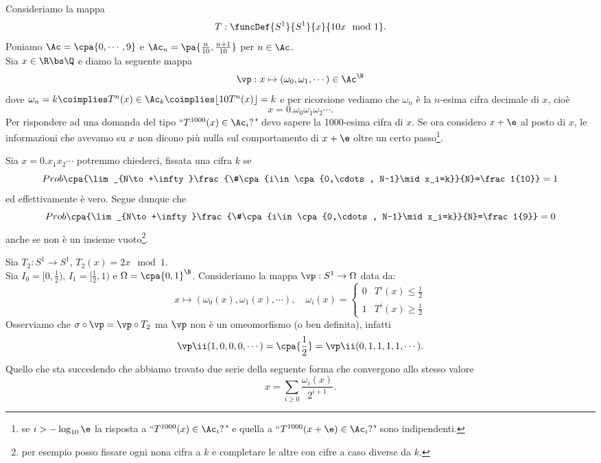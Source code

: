 \begin{example}
Consideriamo la mappa
\[T:\funcDef{S^1}{S^1}{x}{10x \mod 1}.\]
Poniamo $\Ac=\cpa{0,\cdots,9}$ e $\Ac_n=\pa{\frac n{10},\frac{n+1}{10}}$ per $n\in\Ac$.\\
Sia $x\in \R\bs \Q$ e diamo la seguente mappa
\[\vp:x\mapsto(\omega_0,\omega_1,\cdots)\in \Ac^{\N}\]
dove $\omega_n=k\coimplies T^n(x)\in \Ac_k\coimplies \lfloor10 T^n(x)\rfloor=k$ e per ricorsione vediamo che $\omega_n$ \`e la $n$-esima cifra decimale di $x$, cio\`e
\[x=0.\omega_0\omega_1\omega_2\cdots.\]
Per rispondere ad una domanda del tipo ``$T^{1000}(x)\in \Ac_i?$" devo sapere la 1000-esima cifra di $x$. Se ora considero $x+\e$ al posto di $x$, le informazioni che avevamo su $x$ non dicono pi\`u nulla sul comportamento di $x+\e$ oltre un certo passo\footnote{se $i>-\log_{10} \e$ la risposta a ``$T^{1000}(x)\in \Ac_i?$" e quella a ``$T^{1000}(x+\e)\in \Ac_i?$" sono indipendenti.}.
\end{example}
    
\begin{remark}
Sia $x=0.x_1x_2\cdots$ potremmo chiederci, fissata una cifra $k$ se
\[Prob\cpa{\lim_{N\to+\infty}\frac{\#\cpa{i\in \cpa{0,\cdots, N-1}\mid x_i=k}}{N}=\frac1{10}}=1\]
ed effettivamente \`e vero. Segue dunque che
\[Prob\cpa{\lim_{N\to+\infty}\frac{\#\cpa{i\in \cpa{0,\cdots, N-1}\mid x_i=k}}{N}=\frac1{9}}=0\]
anche se non \`e un insieme vuoto\footnote{per esempio posso fissare ogni nona cifra a $k$ e completare le altre con cifre a caso diverse da $k$.}.
\end{remark}

\begin{example}
Sia $T_2:S^1\to S^1$, $T_2(x)=2x\mod 1$.\\
Sia $I_0=[0,\frac12)$, $I_1=[\frac12,1)$ e $\Omega=\cpa{0,1}^\N$. Consideriamo la mappa $\vp:S^1\to \Omega$ data da:
\[x\mapsto (\omega_0(x),\omega_1(x),\cdots),\quad \omega_i(x)=\begin{cases}
0 & T^i(x)\leq \frac12\\
1 & T^i(x)\geq\frac12
\end{cases}\]
Osserviamo che $\sigma\circ \vp=\vp\circ T_2$ ma $\vp$ non \`e un omeomorfismo (o ben definita), infatti
\[\vp\ii(1,0,0,0,\cdots)=\cpa{\frac12}=\vp\ii(0,1,1,1,1,\cdots).\]
Quello che sta succedendo che abbiamo trovato due serie della seguente forma che convergono allo stesso valore
\[x=\sum_{i\geq 0}\frac{\omega_i(x)}{2^{i+1}}.\]
\end{example}


